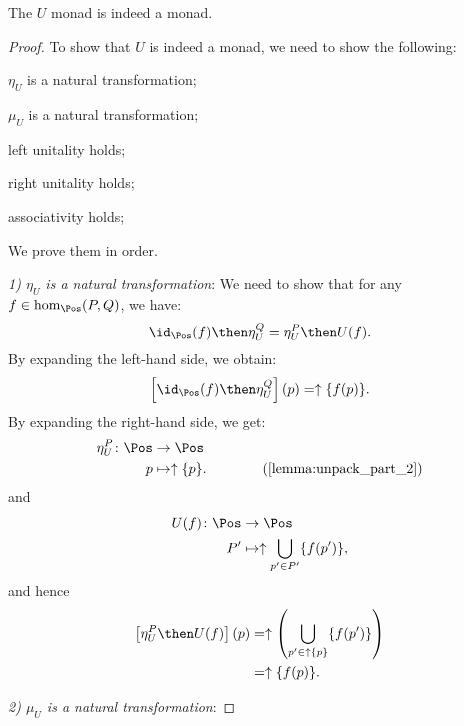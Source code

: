 \begin{lemma}
The $U$ monad is indeed a monad.
\end{lemma}
\begin{proof}
To show that $U$ is indeed a monad, we need to show the following:
\begin{compactenum}
    \item $\eta_U$ is a natural transformation;
    \item $\mu_U$ is a natural transformation;
    \item left unitality holds;
    \item right unitality holds;
    \item associativity holds;
\end{compactenum}
We prove them in order.

\emph{1) $\eta_U$ is a natural transformation}: We need to show that for any $f\in \hom_{\Pos}(P,Q)$, we have:
\begin{equation}
    \id_{\Pos}(f)\then \eta_{U}^Q=\eta_{U}^P\then U(f).
\end{equation}
By expanding the left-hand side, we obtain:
\begin{equation}
    \left[\id_{\Pos}(f)\then \eta_{U}^Q\right](p)=\uparrow \{f(p)\}.
\end{equation}
By expanding the right-hand side, we get:
\begin{equation}
    \begin{aligned}
    \eta_{U}^P\colon \Pos &\to \Pos\\
    p&\mapsto \uparrow \{p\}. \qquad \qquad (\cref{lemma:unpack_part_2})
    \end{aligned}
\end{equation}
and
\begin{equation}
    \begin{aligned}
    U(f)\colon \Pos &\to \Pos\\
    P'&\mapsto \uparrow \bigcup_{p'\in P'}\{f(p')\},
    \end{aligned}
\end{equation}
and hence
\begin{equation}
    \begin{aligned}
    \left[\eta_{U}^P\then U(f)\right](p)&=\uparrow \left( \bigcup_{p'\in \uparrow \{p\}} \{f(p')\}\right)\\
    &=\uparrow \{f(p)\}.
    \end{aligned}
\end{equation}

\emph{2) $\mu_U$ is a natural transformation}:
\end{proof}